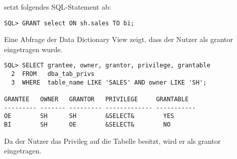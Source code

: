            setzt folgendes SQL-Statement ab:
          \begin{lstlisting}[caption={\identifier{oe} erteilt \identifier{bi} das SELECT-Privileg auf \identifier{sh.sales}},label=admin240,language=oracle_sql]
SQL> GRANT select ON sh.sales TO bi;
          \end{lstlisting}
          Eine Abfrage der Data Dictionary View  zeigt, dass der Nutzer  als grantor eingetragen wurde.
          \begin{lstlisting}[caption={Abfrage der View \identifier{dba\_tab\_privs} - 2},language=oracle_sql,label=admin241,language=oracle_sql]
SQL> SELECT grantee, owner, grantor, privilege, grantable
  2  FROM   dba_tab_privs
  3  WHERE  table_name LIKE 'SALES' AND owner LIKE 'SH';

GRANTEE   OWNER   GRANTOR   PRIVILEGE     GRANTABLE
--------- ------- --------- ------------- -----------
OE        SH      SH        &SELECT&        YES
BI        SH      OE        &SELECT&        NO
          \end{lstlisting}
          Da der Nutzer  das  Privileg auf die Tabelle  besitzt, wird er als grantor eingetragen.
